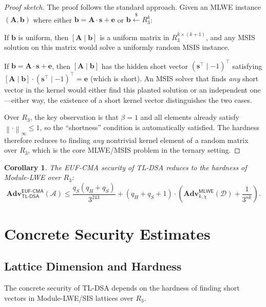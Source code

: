 \documentclass[11pt,a4paper]{article}
\newtheorem{corollary}[theorem]{Corollary}
\theoremstyle{definition}
\newcommand{\linf}[1]{\left\lVert #1 \right\rVert_{\infty}}
\newcommand{\Adv}{\mathbf{Adv}}
\newcommand{\MLWE}{\textsf{MLWE}}
\newcommand{\EUFCMA}{\textsf{EUF-CMA}}
\begin{document}
\begin{proof}[Proof sketch]
The proof follows the standard approach. Given an MLWE instance $(\mathbf{A}, \mathbf{b})$ where either $\mathbf{b} = \mathbf{A} \cdot \mathbf{s} + \mathbf{e}$ or $\mathbf{b} \xleftarrow{\$} R_3^k$:

If $\mathbf{b}$ is uniform, then $[\mathbf{A} \mid \mathbf{b}]$ is a uniform matrix in $R_3^{k \times (k+1)}$, and any MSIS solution on this matrix would solve a uniformly random MSIS instance.

If $\mathbf{b} = \mathbf{A} \cdot \mathbf{s} + \mathbf{e}$, then $[\mathbf{A} \mid \mathbf{b}]$ has the hidden short vector $(\mathbf{s}^\top \mid -1)^\top$ satisfying $[\mathbf{A} \mid \mathbf{b}] \cdot (\mathbf{s}^\top \mid -1)^\top = \mathbf{e}$ (which is short). An MSIS solver that finds \emph{any} short vector in the kernel would either find this planted solution or an independent one---either way, the existence of a short kernel vector distinguishes the two cases.

Over $R_3$, the key observation is that $\beta = 1$ and all elements already satisfy $\linf{\cdot} \leq 1$, so the ``shortness'' condition is automatically satisfied. The hardness therefore reduces to finding \emph{any} nontrivial kernel element of a random matrix over $R_3$, which is the core MLWE/MSIS problem in the ternary setting.
\end{proof}

\begin{corollary}
The EUF-CMA security of TL-DSA reduces to the hardness of Module-LWE over $R_3$:
\[
  \Adv^{\EUFCMA}_{\textsf{TL-DSA}}(\mathcal{A})
  \leq \frac{q_S(q_H + q_S)}{3^{243}} + (q_H + q_S + 1) \cdot \left( \Adv^{\MLWE}_{k, \chi}(\mathcal{D}) + \frac{1}{3^{nk}} \right).
\]
\end{corollary}

\section{Concrete Security Estimates}
\label{sec:concrete}

\subsection{Lattice Dimension and Hardness}

The concrete security of TL-DSA depends on the hardness of finding short vectors in Module-LWE/SIS lattices over $R_3$.
\end{document}
